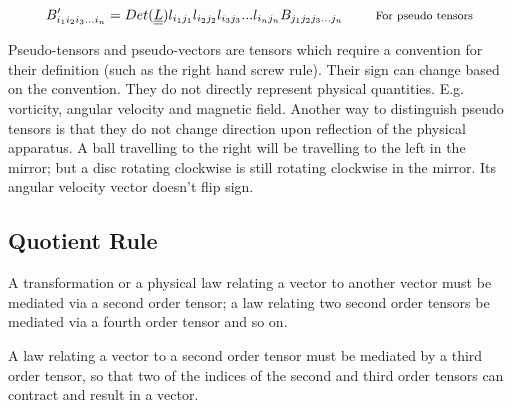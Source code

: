 \documentclass[11pt, letterpaper]{article}
\newcommand{\1}{\bm{1}}
\newcommand{\uu}[1]{\underline{\underline{#1}}}
\begin{document}
$$B'_{i_1i_2i_3...i_n} = Det(\uu{L})l_{i_1j_1}l_{i_2j_2}l_{i_3j_3}...l_{i_nj_n}B_{j_1j_2j_3...j_n} \text{ \quad \quad \footnotesize{For pseudo tensors}}$$

Pseudo-tensors and pseudo-vectors are tensors which require a convention for their definition (such as the right hand screw rule). Their sign can change based on the convention. They do not directly represent physical quantities. E.g. vorticity, angular velocity and magnetic field. Another way to distinguish pseudo tensors is that they do not change direction upon reflection of the physical apparatus. A ball travelling to the right will be travelling to the left in the mirror; but a disc rotating clockwise is still rotating clockwise in the mirror. Its angular velocity vector doesn't flip sign. 

\subsection{Quotient Rule}
A transformation or a physical law relating a vector to another vector must be mediated via a second order tensor; a law relating two second order tensors be mediated via a fourth order tensor and so on.

A law relating a vector to a second order tensor must be mediated by a third order tensor, so that two of the indices of the second and third order tensors can contract and result in a vector.
\end{document}
